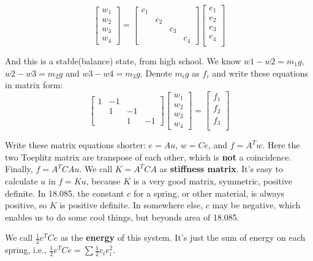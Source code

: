 \documentclass{article}
\begin{document}
\begin{spacing}{1.5}
$$
\begin{bmatrix}
w_1 \\
w_2 \\
w_3 \\
w_4
\end{bmatrix}
=
\begin{bmatrix}
c_1  &   &  \\
 & c_2 & \\
&  & c_3\\
&   & & c_4 
\end{bmatrix}
\begin{bmatrix}
e_1 \\
e_2 \\
e_3 \\
e_4 \\
\end{bmatrix}
$$

And this is a stable(balance) state, from high school. We know $w1-w2=m_1g$, $w2-w3=m_2g$ and $w3-w4=m_3g$. Denote $m_ig$ as $f_i$ and write these equations in matrix form:
$$
\begin{bmatrix}
1  &  -1 &  \\
& 1 & -1\\
&   & 1& -1
\end{bmatrix}
\begin{bmatrix}
	w_1 \\
	w_2 \\
	w_3 \\
	w_4
\end{bmatrix}
=
\begin{bmatrix}
	f_1 \\
	f_2 \\
	f_3 \\
\end{bmatrix}
$$

Write these matrix equations shorter: $e=Au$, $w=Ce$, and $f=A^Tw$. Here the two Toeplitz matrix are transpose of each other, which is {\bfseries not} a coincidence. Finally, $f=A^TCAu$. We call $K=A^TCA$ as {\bfseries stiffness matrix}. It's easy to calculate $u$ in $f=Ku$, because $K$ is a very good matrix, symmetric, positive definite. In 18.085, the constant $c$ for a spring, or other material, is always positive, so $K$ is positive definite. In somewhere else, $c$ may be negative, which enables us to do some cool things, but beyonds area of 18.085.

We call $\frac{1}{2}e^TCe$ as the {\bfseries energy} of this system. It's just the sum of energy on each spring, i.e., $\frac{1}{2}e^TCe=\sum \frac{1}{2}c_ie_i^2$.


\end{spacing}
\end{document}
